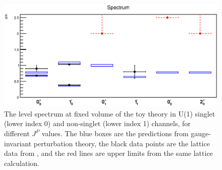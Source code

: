 \documentclass[final,12pt]{article}
\newcommand*{\1}{1\!\!\!\bot}
\begin{document}
\begin{figure}
\includegraphics[width=\linewidth]{spec-su3}
\caption{\label{fig:gutspec}The level spectrum at fixed volume of the toy theory in U(1) singlet (lower index 0) and non-singlet (lower index 1) channels, for different $J^P$ values. The blue boxes are the predictions from gauge-invariant perturbation theory, the black data points are the lattice data from \cite{Maas:unpublishedtoerek}, and the red lines are upper limits from the same lattice calculation.}
\end{figure}
\end{document}
